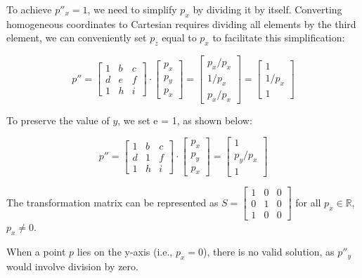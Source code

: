 \documentclass{article}
\begin{document}
To achieve $p''_x = 1$, we need to simplify $p_x$ by dividing it by itself. Converting homogeneous coordinates to Cartesian requires dividing all elements by the third element, we can conveniently set $p_z$ equal to $p_x$ to facilitate this simplification:

\[
    p'' = \begin{bmatrix} 1 & b & c \\ d & e & f \\ 1 & h & i \end{bmatrix} \cdot \begin{bmatrix} p_x \\ p_y \\ p_x \end{bmatrix} = \begin{bmatrix} p_x/p_x \\ 1/p_x \\ p_x / p_x \end{bmatrix} = \begin{bmatrix} 1 \\ 1 / p_x \\ 1 \end{bmatrix}
\]

To preserve the value of $y$, we set e = 1, as shown below:

\[
    p'' = \begin{bmatrix} 1 & b & c \\ d & 1 & f \\ 1 & h & i \end{bmatrix} \cdot \begin{bmatrix} p_x \\ p_y \\ p_x \end{bmatrix} = \begin{bmatrix} 1 \\ p_y / p_x \\ 1 \end{bmatrix}
\]

The transformation matrix can be represented as $ S = \begin{bmatrix} 1 & 0 & 0 \\ 0 & 1 & 0 \\ 1 & 0 & 0 \end{bmatrix} $ for all $p_x \in \mathbb{R}$, $p_x \neq 0$.

When a point $p$ lies on the y-axis (i.e., $p_x = 0$), there is no valid solution, as $p''_y$ would involve division by zero.
\end{document}
